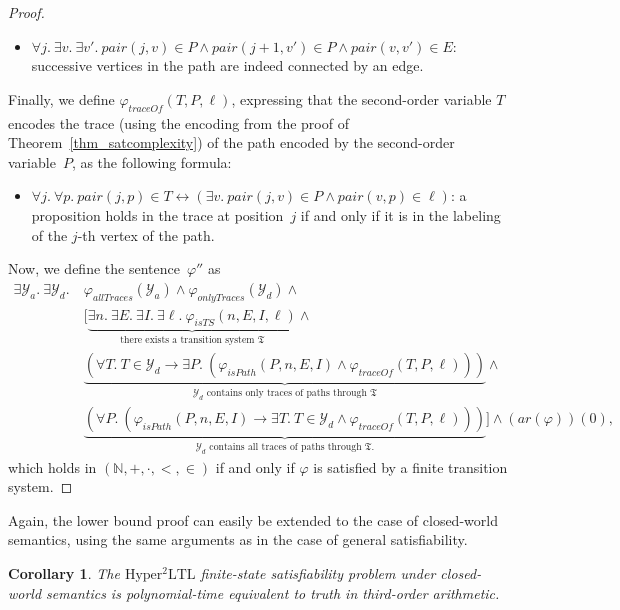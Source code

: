 \documentclass[dvipsnames,10pt,a4paper]{amsart}
\newtheorem{cor}[thm]{Corollary}
\theoremstyle{definition}
\theoremstyle{remark}
\newcommand{\nats}{\mathbb{N}}
\renewcommand{\phi}{\varphi}
\newcommand{\sohyltl}{\mathrm{Hyper^2LTL}\xspace}
\newcommand{\tsys}{\mathfrak{T}}
\newcommand{\arithmetize}{{\mathit{ar}}}
\newcommand{\pair}{\mathit{pair}}
\newcommand{\onlytraces}{\mathit{onlyTraces}}
\newcommand{\alltraces}{\mathit{allTraces}}
\newcommand{\calY}{\mathcal{Y}}
\newcommand{\ists}{\mathit{isTS}}
\newcommand{\ispath}{\mathit{isPath}}
\newcommand{\traceof}{\mathit{traceOf}}
\newcommand{\natsstruct}{(\nats, +, \cdot, <, \in)}
\begin{document}
\begin{proof}
\begin{itemize}
    \item $\forall j.\ \exists v.\ \exists v'.\ \pair(j,v) \in P \wedge \pair(j+1, v') \in P \wedge \pair(v,v') \in E $: successive vertices in the path are indeed connected by an edge.
\end{itemize}

Finally, we define $\phi_\traceof(T, P, \ell)$, expressing that the second-order variable $T$ encodes the trace (using the encoding from the proof of Theorem~\ref{thm_satcomplexity}) of the path encoded by the second-order variable~$P$, as the  following formula:
\begin{itemize}
    \item $\forall j.\ \forall p.\ \pair(j,p) \in T \leftrightarrow (\exists v.\ \pair(j,v) \in P \wedge \pair(v,p) \in \ell)$: a proposition holds in the trace at position~$j$ if and only if it is in the labeling of the $j$-th vertex of the path.
\end{itemize}

Now, we define the sentence~$\phi''$ as 
\begin{align*}
\exists \calY_a.\ \exists\calY_d.\ {}&{} \phi_\alltraces(\calY_a) \wedge \phi_\onlytraces(\calY_d) \wedge\\
%
&{}\Big[\underbrace{\exists n.\ \exists E.\ \exists I.\ \exists \ell.\ \phi_\ists(n, E, I, \ell)}_{\text{there exists a transition system~$\tsys$}} \wedge \\
&{}\underbrace{(\forall T.\ T \in \calY_d \rightarrow \exists P.\ (\phi_\ispath(P, n, E, I) \wedge \phi_\traceof(T,P, \ell)))}_{\text{$\calY_d$ contains only traces of paths through $\tsys$}}\wedge\\
%
&{}\underbrace{( \forall P.\ (\phi_\ispath(P, n,E,I) \rightarrow \exists T.\ T \in \calY_d \wedge \phi_\traceof(T,P, \ell)) )}_{\text{$\calY_d$ contains all traces of paths through $\tsys$.}}\Big]\wedge  (\arithmetize(\phi))(0),
\end{align*}
which holds in $\natsstruct$ if and only if $\phi$ is satisfied by a finite transition system.
\end{proof}

Again, the lower bound proof can easily be extended to the case of closed-world semantics, using the same arguments as in the case of general satisfiability.

\begin{cor}
\label{cor_finsatcomplexity_cw}
The $\sohyltl$ finite-state satisfiability problem under closed-world semantics is polynomial-time equivalent to truth in third-order arithmetic.
\end{cor}
\end{document}
